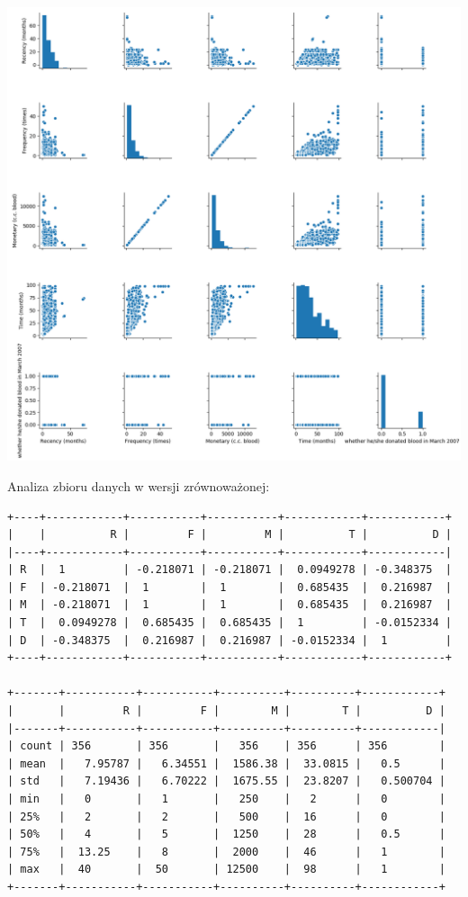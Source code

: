 \documentclass[11pt, a4paper, notitlepage]{report}
\begin{document}
\includegraphics[width=400pt,height=400pt]{graphics/correlation_1} \\ 

Analiza zbioru danych w wersji zrównoważonej:

\begin{verbatim}
+----+------------+-----------+-----------+------------+------------+
|    |          R |         F |         M |          T |          D |
|----+------------+-----------+-----------+------------+------------|
| R  |  1         | -0.218071 | -0.218071 |  0.0949278 | -0.348375  |
| F  | -0.218071  |  1        |  1        |  0.685435  |  0.216987  |
| M  | -0.218071  |  1        |  1        |  0.685435  |  0.216987  |
| T  |  0.0949278 |  0.685435 |  0.685435 |  1         | -0.0152334 |
| D  | -0.348375  |  0.216987 |  0.216987 | -0.0152334 |  1         |
+----+------------+-----------+-----------+------------+------------+

+-------+-----------+-----------+----------+----------+------------+
|       |         R |         F |        M |        T |          D |
|-------+-----------+-----------+----------+----------+------------|
| count | 356       | 356       |   356    | 356      | 356        |
| mean  |   7.95787 |   6.34551 |  1586.38 |  33.0815 |   0.5      |
| std   |   7.19436 |   6.70222 |  1675.55 |  23.8207 |   0.500704 |
| min   |   0       |   1       |   250    |   2      |   0        |
| 25%   |   2       |   2       |   500    |  16      |   0        |
| 50%   |   4       |   5       |  1250    |  28      |   0.5      |
| 75%   |  13.25    |   8       |  2000    |  46      |   1        |
| max   |  40       |  50       | 12500    |  98      |   1        |
+-------+-----------+-----------+----------+----------+------------+
\end{verbatim}
\end{document}
